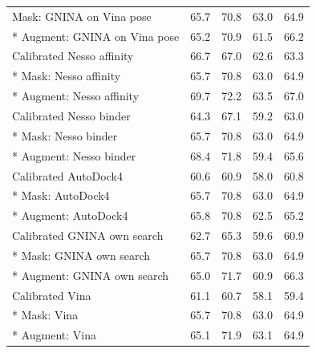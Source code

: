 \documentclass[pdflatex,sn-nature]{sn-jnl}
\begin{document}
\begin{longtable}{lrrrr}
Mask: GNINA on Vina pose & 65.7 & 70.8 & 63.0 & 64.9\\*
Augment: GNINA on Vina pose & 65.2 & 70.9 & 61.5 & 66.2\\
Calibrated Nesso affinity & 66.7 & 67.0 & 62.6 & 63.3\\*
Mask: Nesso affinity & 65.7 & 70.8 & 63.0 & 64.9\\*
Augment: Nesso affinity & 69.7 & 72.2 & 63.5 & 67.0\\
Calibrated Nesso binder & 64.3 & 67.1 & 59.2 & 63.0\\*
Mask: Nesso binder & 65.7 & 70.8 & 63.0 & 64.9\\*
Augment: Nesso binder & 68.4 & 71.8 & 59.4 & 65.6\\
Calibrated AutoDock4 & 60.6 & 60.9 & 58.0 & 60.8\\*
Mask: AutoDock4 & 65.7 & 70.8 & 63.0 & 64.9\\*
Augment: AutoDock4 & 65.8 & 70.8 & 62.5 & 65.2\\
Calibrated GNINA own search & 62.7 & 65.3 & 59.6 & 60.9\\*
Mask: GNINA own search & 65.7 & 70.8 & 63.0 & 64.9\\*
Augment: GNINA own search & 65.0 & 71.7 & 60.9 & 66.3\\
Calibrated Vina & 61.1 & 60.7 & 58.1 & 59.4\\*
Mask: Vina & 65.7 & 70.8 & 63.0 & 64.9\\*
Augment: Vina & 65.1 & 71.9 & 63.1 & 64.9\\
\bottomrule
\end{longtable}
\normalsize

\clearpage
\end{document}

